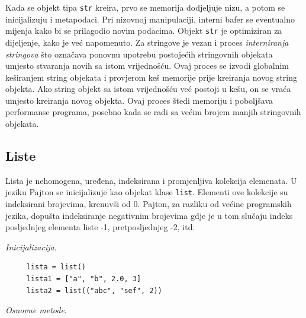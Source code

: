 Kada se objekt tipa \texttt{str} kreira, prvo se memorija dodjeljuje nizu, a potom se inicijalizuju i metapodaci. Pri nizovnoj manipulaciji, interni bafer se eventualno mijenja kako bi se prilagodio novim podacima. Objekt \texttt{str} je   optimiziran za dijeljenje, kako je već napomenuto. %
 Za stringove je vezan i proces   \textit{interniranja stringova} što označava ponovnu upotrebu postojećih stringovnih objekata umjesto stvaranja novih sa istom vrijednošću. Ovaj proces se izvodi   globalnim keširanjem string objekata i provjerom    keš memorije prije kreiranja novog string objekta. Ako string objekt sa istom vrijednošću već postoji u kešu, on se vraća umjesto kreiranja novog objekta. Ovaj proces štedi memoriju i poboljšava performanse programa, posebno kada se radi sa većim brojem manjih stringovnih objekata.


\subsection{Liste}
Lista je nehomogena, uređena, indeksirana i promjenljiva kolekcija elemenata. U jeziku Pajton se inicijalizuje kao objekat klase \texttt{list}. Elementi ove kolekcije su indeksirani brojevima, krenuvši od 0. Pajton, za razliku od većine programskih jezika, dopušta indeksiranje negativnim brojevima gdje je u tom slučaju indeks posljednjeg elementa liste -1, pretposljednjeg -2, itd.  

\textit{Inicijalizacija}.

\begin{verbatim}
	 lista = list()
	 lista1 = ["a", "b", 2.0, 3]
	 lista2 = list(("abc", "sef", 2))
\end{verbatim}

\textit{Osnovne metode}.   

